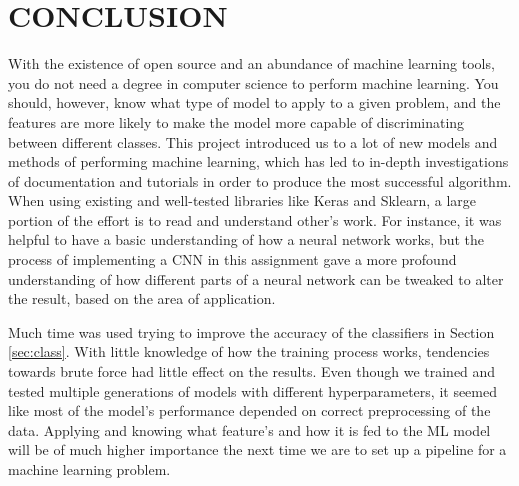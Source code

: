 \section{CONCLUSION}




With the existence of open source and an abundance of machine learning tools, you do not need a degree in computer science to perform machine learning. You should, however, know what type of model to apply to a given problem, and the features are more likely to make the model more capable of discriminating between different classes. This project introduced us to a lot of new models and methods of performing machine learning, which has led to in-depth investigations of documentation and tutorials in order to produce the most successful algorithm. When using existing and well-tested libraries like Keras and Sklearn, a large portion of the effort is to read and understand other's work. For instance, it was helpful to have a basic understanding of how a neural network works, but the process of implementing a CNN in this assignment gave a more profound understanding of how different parts of a neural network can be tweaked to alter the result, based on the area of application.

Much time was used trying to improve the accuracy of the classifiers in Section \ref{sec:class}. With little knowledge of how the training process works, tendencies towards brute force had little effect on the results. Even though we trained and tested multiple generations of models with different hyperparameters, it seemed like most of the model's performance depended on correct preprocessing of the data. Applying and knowing what feature's and how it is fed to the ML model will be of much higher importance the next time we are to set up a pipeline for a machine learning problem.

\printbibliography[title={REFERENCES}]